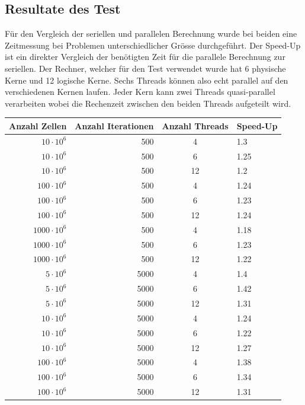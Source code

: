 \subsection{Resultate des Test
\label{parallelisierung:sub:Test}}

Für den Vergleich der seriellen und parallelen Berechnung wurde bei beiden eine Zeitmessung bei Problemen unterschiedlicher Grösse durchgeführt.
Der Speed-Up ist ein direkter Vergleich der benötigten Zeit für die parallele Berechnung zur seriellen.
Der Rechner, welcher für den Test verwendet wurde hat 6 physische Kerne und 12 logische Kerne. 
Sechs Threads können also echt parallel auf den verschiedenen Kernen laufen.
Jeder Kern kann zwei Threads quasi-parallel verarbeiten wobei die Rechenzeit zwischen den beiden Threads aufgeteilt wird.


\begin{table}
	\centering
	\begin{tabular}{r r c l}
		Anzahl Zellen & Anzahl Iterationen & Anzahl Threads & Speed-Up \\
		\hline
		$10 \cdot 10^6$ & 500 & 4 & 1.3\\
		$10 \cdot 10^6$ & 500 & 6 & 1.25\\
		$10 \cdot 10^6$ & 500 & 12 & 1.2\\
		
		$100 \cdot 10^6$ & 500 & 4 & 1.24\\
		$100 \cdot 10^6$ & 500 & 6 & 1.23\\
		$100 \cdot 10^6$ & 500 & 12 & 1.24\\
		
		$1000 \cdot 10^6$ & 500 & 4 & 1.18\\
		$1000 \cdot 10^6$ & 500 & 6 & 1.23\\
		$1000 \cdot 10^6$ & 500 & 12 & 1.22\\
		
		
		$5 \cdot 10^6$ & 5000 & 4  & 1.4 \\
		$5 \cdot 10^6$ & 5000 & 6  & 1.42 \\
		$5 \cdot 10^6$ & 5000 & 12  & 1.31\\
		
		
		$10 \cdot 10^6$ & 5000 & 4 & 1.24\\
		$10 \cdot 10^6$ & 5000 & 6 & 1.22\\
		$10 \cdot 10^6$ & 5000 & 12 & 1.27\\
		
		$100 \cdot 10^6$ & 5000 & 4 & 1.38\\
		$100 \cdot 10^6$ & 5000 & 6 & 1.34\\
		$100 \cdot 10^6$ & 5000 & 12 & 1.31\\
		

\end{tabular}
\end{table}
